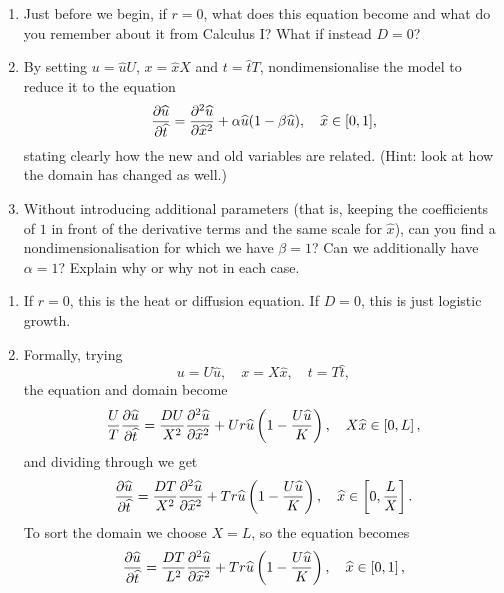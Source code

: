 \documentclass[a4paper, 12pt]{article}
\begin{document}
\begin{enumerate}[label={\bf \arabic{*}.\;}, ref={\arabic{*}},itemsep=3ex, left=0ex]
{      \begin{enumerate}[label=(\alph*)]
        \item Just before we begin, if $r=0$, what does this equation become and what do you remember about it from Calculus I? What if instead $D=0$?
        \item By setting $u = \hat{u}U$, $x = \hat{x}X$ and $t = \hat{t}T$, nondimensionalise the model to reduce it to the equation
          \begin{equation}
            \pd{\hat{u}}{\hat{t}} = \pdd{\hat{u}}{\hat{x}} + \alpha \hat{u}(1-\beta \hat{u}), \quad \hat{x} \in [0,1],\label{FKPP_nondim}
          \end{equation}
          stating clearly how the new and old variables are related. (Hint: look at how the domain has changed as well.)
        \item Without introducing additional parameters (that is, keeping the coefficients of $1$ in front of the derivative terms and the same scale for $\hat{x}$), can you find a nondimensionalisation for which we have $\beta=1$? Can we additionally have $\alpha=1$? Explain why or why not in each case.
      \end{enumerate}
    }
    {
      \begin{enumerate}[label=(\alph*)]
        \item If $r=0$, this is the heat or diffusion equation. If $D=0$, this is just logistic growth.
        \item Formally, trying
          \begin{equation}
            u=U\hat{u}, \quad x = X\hat{x}, \quad t = T\hat{t},
          \end{equation}
          the equation and domain become
          \begin{equation}
            \frac{U}{T}\pd{\hat{u}}{\hat{t}} = \frac{DU}{X^2}\pdd{\hat{u}}{\hat{x}}+Ur\hat{u}\left(1-\frac{U\hat{u}}{K}\right), \quad X\hat{x}\in\left[0,L\right],
          \end{equation}
          and dividing through we get
          \begin{equation}
            \pd{\hat{u}}{\hat{t}} = \frac{DT}{X^2}\pdd{\hat{u}}{\hat{x}}+Tr\hat{u}\left(1-\frac{U\hat{u}}{K}\right), \quad \hat{x}\in\left[0,\frac{L}{X}\right].
          \end{equation}
          To sort the domain we choose $X=L$, so the equation becomes
          \begin{equation}
            \pd{\hat{u}}{\hat{t}} = \frac{DT}{L^2}\pdd{\hat{u}}{\hat{x}}+Tr\hat{u}\left(1-\frac{U\hat{u}}{K}\right), \quad \hat{x}\in\left[0,1\right],

\end{equation}
\end{enumerate}}
\end{enumerate}
\end{document}
